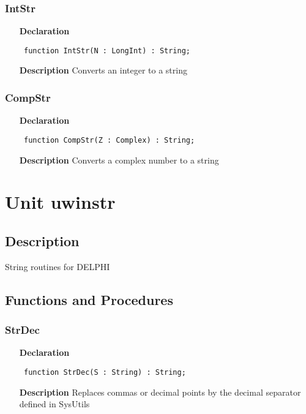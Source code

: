 \documentclass[12pt,a4paper,oneside]{report}
\newcommand{\declarationitem}[1]{\textbf{#1}}
\newcommand{\descriptiontitle}[1]{\textbf{#1}}
\newcommand{\code}[1]{\texttt{#1}}
\begin{document}
\subsubsection{IntStr}
\label{ustrings-IntStr}
\begin{itemize}\item[\declarationitem{Declaration}\hfill]
	\begin{flushleft}
		\code{
			function IntStr(N : LongInt) : String;}
		
	\end{flushleft}
	
	\par
	\item[\descriptiontitle{Description}]
	Converts an integer to a string
	
\end{itemize}
\subsubsection{CompStr}
\label{ustrings-CompStr}
\begin{itemize}\item[\declarationitem{Declaration}\hfill]
	\begin{flushleft}
		\code{
			function CompStr(Z : Complex) : String;}
		
	\end{flushleft}
	
	\par
	\item[\descriptiontitle{Description}]
	Converts a complex number to a string
	
\end{itemize}
\section{Unit uwinstr}
\label{uwinstr}
\subsection{Description}
String routines for DELPHI 
\subsection{Functions and Procedures}
\subsubsection{StrDec}
\label{uwinstr-StrDec}
\begin{itemize}\item[\declarationitem{Declaration}\hfill]
	\begin{flushleft}
		\code{
			function StrDec(S : String) : String;}
		
	\end{flushleft}
	
	\par
	\item[\descriptiontitle{Description}]
	Replaces commas or decimal points by the decimal separator defined in SysUtils
	
\end{itemize}
\end{document}
